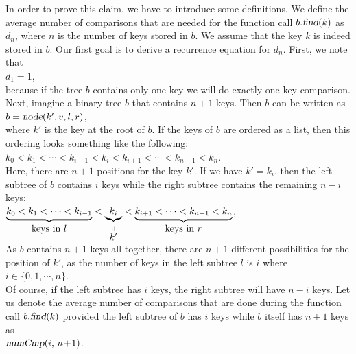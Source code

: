 In order to prove this claim, we have to introduce some definitions.
We define the \underline{avera}g\underline{e} number of comparisons that are needed for the function
call $b.\textsl{find}(k)$ as  $d_n$, where $n$ is the number of keys stored in $b$.  We assume that
the key $k$ is indeed stored in $b$.  Our first goal is to derive a recurrence equation for 
$d_n$.  First, we note that  
\\[0.2cm]
\hspace*{1.3cm} $d_1 = 1$,
\\[0.2cm]
because if the tree $b$ contains only one key we will do exactly one key comparison.
Next, imagine a binary tree $b$ that contains $n+1$ keys.  Then $b$
can be written as 
\\[0.2cm]
\hspace*{1.3cm}
$b = \textsl{node}(k',v,l,r)$,
\\[0.2cm]
where $k'$ is the key at the root of $b$.  If the keys of $b$ are ordered as a list, then this
ordering looks something like the following:
\\[0.2cm]
\hspace*{1.3cm}
$k_0 < k_1 < \cdots < k_{i-1} < k_{i} < k_{i+1} < \cdots < k_{n-1} < k_n$.
\\[0.2cm]
Here, there are $n+1$ positions for the key $k'$.
If we have $k' = k_i$, then the left subtree of $b$ contains  $i$ keys while the right subtree
contains the remaining  $n-i$ keys:
\\[0.2cm]
\hspace*{1.3cm}
$\underbrace{k_0 < k_1 < \cdots < k_{i-1}}_{\mbox{keys in $l$}} < 
 \underbrace{k_{i}}_{\stackrel{\displaystyle \shortparallel}{\displaystyle k'}} < 
 \underbrace{k_{i+1} < \cdots < k_{n-1} < k_n}_{\mbox{keys in $r$}}$,
\\[0.2cm]
As  $b$ contains $n+1$ keys all together, there are  $n+1$ different possibilities for the position
of $k'$, as the number of keys in the left subtree $l$ is $i$ where
\\[0.2cm]
\hspace*{1.3cm}
 $i \in \{0,1, \cdots, n\}$.
\\[0.2cm]
Of course, if the left subtree has $i$ keys, the right subtree will have $n-i$ keys.
Let us denote the average number of comparisons that are done during the function call
$b.\textsl{find}(k)$ provided the left subtree of $b$ has $i$ keys while $b$ itself has $n+1$ keys
as
\\[0.2cm]
\hspace*{1.3cm}
$\textsl{numCmp}(i,\, n\!+\!1)$.
